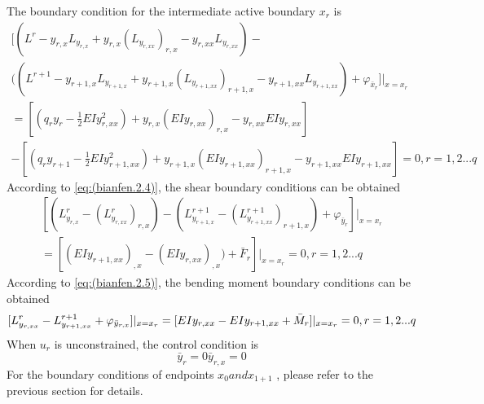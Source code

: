 The boundary condition for the intermediate active boundary $ x_ {r}$  is
\begin{multline} \label{eq:(zxxgyl.3.4)}    
[(L^ {r}-y_ {r,x} L_{y_{r,x}}   + y_{r,x} \left(L_{y_{r,xx}}\right)_{r,x}
-y_{r,xx} L_{y_{r,xx}} 
)-\\((L^{r+1}-y_{r+1,x} L_{y_{r+1,x}}   + y_{r+1,x} \left(L_{y_{r+1,xx}}\right)_{r+1,x}
-y_{r+1,xx} L_{y_{r+1,xx}} 
)+\varphi_{\bar {x}_ {r}}]|_{x=x_r}  
\\=[(q_r y_r-\frac{1} {2}EIy_ {r,xx}^2)+y_{r,x} \left(EIy_{r,xx}\right)_{r,x} 
-y_{r,xx} EIy_{r,xx}]
\\-[(q_r y_{r+1}-\frac{1} {2}EIy_ {r+1,xx}^2)+y_{r+1,x} \left(EIy_{r+1,xx}\right)_{r+1,x} 
-y_{r+1,xx} EIy_{r+1,xx}]
=0,r=1,2...q
\end{multline}
According to \ref{eq:(bianfen.2.4)}, the shear boundary conditions can be obtained
\begin{multline} \label{eq:(zxxgyl.3.5)}    
[(L^ {r}_ {y_{r,x}} -\left(L^ {r}_ {y_{r,xx}}\right)_{r,x} )-(L^{r+1}_{y_{r+1,x}} -\left(L^{r+1}_{y_{r+1,xx}}\right)_{r+1,x}) + \varphi_{\bar {y}_ {r} }]|_{x=x_r}
\\=[(EIy_{r+1,xx})_{,x}-(EIy_{r,xx})_{,x})+ \bar {F}_r ]|_{x=x_r}
=0,r=1,2...q
\end{multline}
According to \ref{eq:(bianfen.2.5)}, the bending moment boundary conditions can be obtained
\begin{equation} \label{eq:(zxxgyl.3.6)}    
[L^ {r}_ {y_{r,xx}} - L^{r+1}_{y_{r+1,xx}}+\varphi_{\bar {y}_ {r,x}}]|_{x=x_r} 
\\=[EIy_{r,xx}  -EIy_{r+1,xx}  +\bar {M}_r ]|_{x=x_r}
=0,r=1,2...q
\end{equation}
When $ u_r $ is unconstrained, the control condition is
\begin{subequations}\label{eq:(zxxgyl.3.7)} 
\begin{equation}    
\bar {y}_ {r}=0
\end{equation}
\begin{equation}    
\bar {y}_ {r,x}=0
\end{equation}    
\end{subequations}
For the boundary conditions of endpoints $ x_0 and x_ {1+1}$  , please refer to the previous section for details.
